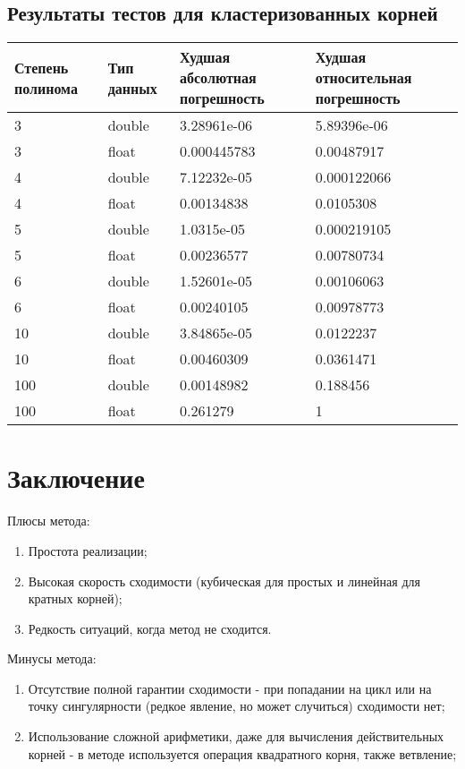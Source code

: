 \documentclass[a4paper,12pt]{article}
\begin{document}
\subsection{Результаты тестов для кластеризованных корней}
\begin{center}
  \begin{tabular}{|p{2.5cm}|p{3.0cm}|p{5.0cm}|p{5.0cm}|}
  \hline
  \textbf{Степень полинома}  & \textbf{Тип данных} & \textbf{Худшая абсолютная погрешность} & \textbf{Худшая относительная погрешность} \\
  \hline
  3 & double & 3.28961e-06 & 5.89396e-06 \\
  \hline
  3 & float & 0.000445783 & 0.00487917 \\
  \hline
  4 & double & 7.12232e-05 & 0.000122066 \\
  \hline
  4 & float & 0.00134838 & 0.0105308 \\
  \hline
  5 & double & 1.0315e-05 & 0.000219105 \\
  \hline
  5 & float & 0.00236577 & 0.00780734 \\
  \hline
  6 & double & 1.52601e-05 & 0.00106063 \\
  \hline
  6 & float & 0.00240105 & 0.00978773 \\
  \hline
  10 & double & 3.84865e-05 & 0.0122237 \\
  \hline
  10 & float & 0.00460309 & 0.0361471 \\
  \hline
  100 & double & 0.00148982 & 0.188456 \\
  \hline
  100 & float & 0.261279 & 1 \\
  \hline
\end{tabular}
\label{tab:my_label_2}
\end{center}

\newpage
\section{Заключение}
Плюсы метода:
\begin{enumerate}
    \item Простота реализации;
    \item Высокая скорость сходимости (кубическая для простых и линейная для кратных корней);
    \item Редкость ситуаций, когда метод не сходится.
\end{enumerate}
Минусы метода:
\begin{enumerate}
    \item Отсутствие полной гарантии сходимости - при попадании на цикл или на точку сингулярности (редкое явление, но может случиться) сходимости нет;
    \item Использование сложной арифметики, даже для вычисления действительных корней - в методе используется операция квадратного корня, также ветвление;
\end{enumerate}
\newpage
\end{document}
